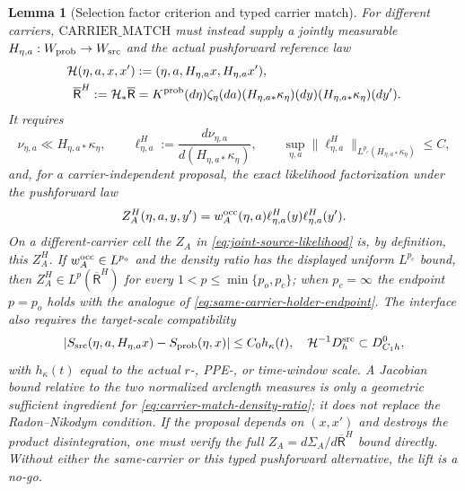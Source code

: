 \documentclass[11pt]{article}
\newtheorem{lemma}[theorem]{Lemma}
\begin{document}
\begin{lemma}[Selection factor criterion and typed carrier match]
For different carriers, $\mathrm{CARRIER\_MATCH}$ must instead supply a
jointly measurable $H_{\eta,a}:W_{\rm prob}\to W_{\rm src}$ and the actual
pushforward reference law
\begin{equation}
\label{eq:carrier-match-pushforward-law}
\begin{aligned}
 \mathcal H(\eta,a,x,x')&:=
  (\eta,a,H_{\eta,a}x,H_{\eta,a}x'),\\
 \overline{\mathsf R}^{H}:=\mathcal H_*\overline{\mathsf R}
 &=K^{\rm prob}(d\eta)\zeta_\eta(da)
   (H_{\eta,a*}\kappa_\eta)(dy)
   (H_{\eta,a*}\kappa_\eta)(dy').
\end{aligned}
\end{equation}
It requires
\begin{equation}
\label{eq:carrier-match-density-ratio}
 \nu_{\eta,a}\ll H_{\eta,a*}\kappa_\eta,
 \qquad \ell_{\eta,a}^{H}:=
 \frac{d\nu_{\eta,a}}{d(H_{\eta,a*}\kappa_\eta)},
 \qquad
 \sup_{\eta,a}\|\ell_{\eta,a}^{H}\|_{
 L^{p_c}(H_{\eta,a*}\kappa_\eta)}\le C,
\end{equation}
and, for a carrier-independent proposal, the exact likelihood
factorization under the pushforward law
\begin{equation}
\label{eq:carrier-match-likelihood-factorization}
 Z_A^{H}(\eta,a,y,y')
 =w_A^{\rm occ}(\eta,a)
   \ell_{\eta,a}^{H}(y)\ell_{\eta,a}^{H}(y').
\end{equation}
On a different-carrier cell the $Z_A$ in
\eqref{eq:joint-source-likelihood} is, by definition, this $Z_A^{H}$.
If $w_A^{\rm occ}\in L^{p_o}$ and the density ratio has the displayed
uniform $L^{p_c}$ bound, then
$Z_A^{H}\in L^p(\overline{\mathsf R}^{H})$ for every
$1<p\le\min\{p_o,p_c\}$; when $p_c=\infty$ the endpoint $p=p_o$ holds with
the analogue of \eqref{eq:same-carrier-holder-endpoint}.
The interface also requires the target-scale compatibility
\begin{equation}
\label{eq:carrier-match-slope-window}
 |S_{\rm src}(\eta,a,H_{\eta,a}x)-S_{\rm prob}(\eta,x)|
 \le C_0h_\kappa(t),
 \quad
 \mathcal H^{-1}D_h^{\rm src}\subset D_{C_1h}^{0},
\end{equation}
with $h_\kappa(t)$ equal to the actual $r$-, PPE-, or time-window scale.
A Jacobian bound relative to the two normalized arclength measures is only a
geometric sufficient ingredient for \eqref{eq:carrier-match-density-ratio};
it does not replace the Radon--Nikodym condition.  If the proposal depends on
$(x,x')$ and destroys the product disintegration, one must verify the full
$Z_A=d\Sigma_A/d\overline{\mathsf R}^{H}$ bound directly.  Without either
the same-carrier or this typed pushforward alternative, the lift is a no-go.
\end{lemma}
\end{document}
